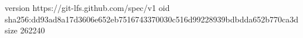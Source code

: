 version https://git-lfs.github.com/spec/v1
oid sha256:dd93ad8a17d3606e652eb7516743370030c516d99228939bdbdda652b770ca3d
size 262240
